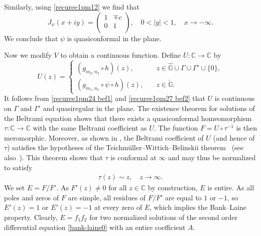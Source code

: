 \documentclass[12pt]{amsart}
\numberwithin{equation}{section}
\begin{document}
Similarly, using \eqref{recuree1pm12} we find that
\begin{equation*}%
J_{\psi}(x+iy)=\left(
                 \begin{array}{cc}
                 1 & \mp c \\
                 0 & 1 \\
                 \end{array}
               \right), \quad 0<|y|<1, \quad x\to-\infty.
\end{equation*}
We conclude that $\psi$ is quasiconformal in the plane.

Now we modify $V$ to obtain a continuous function. Define $U:\mathbb{C}\to \mathbb{C}$ by
\begin{equation}\label{recuree1pm32}
U(z)=\left\{
      \begin{array}{ll}
      (g_{m_2,n_2}\circ h)(z),            & \quad z\in \hat{\mathbb{G}}\cup\Gamma\cup\Gamma'\cup\{0\}, \\
      (g_{m_1,n_1}\circ \psi \circ h)(z), & \quad z\in \check{\mathbb{G}}.
      \end{array}
    \right.
\end{equation}
It follows from \eqref{recuree1pm24  bef1} and \eqref{recuree1pm27  bef2} that $U$ is continuous on $\Gamma$ and $\Gamma'$ and quasiregular in the plane. The existence theorem for solutions of the Beltrami equation \cite[{\S}~V.1]{lehtoVirtanen2008} shows that there exists a quasiconformal homeomorphism $\tau: \mathbb{C}\to \mathbb{C}$ with the same Beltrami coefficient as $U$. The function $F=U\circ\tau^{-1}$ is then meromorphic.
Moreover, as shown in \cite{Bergweilereremenko2017}, the Beltrami coefficient of $U$ (and hence of $\tau$) satisfies the hypotheses of the Teichm\"uller--Wittich--Belinskii theorem~\cite[\S~V.6]{lehtoVirtanen2008} (see also~\cite{Shishikura2018}). This theorem shows that $\tau$ is conformal at $\infty$ and may thus be normalized to satisfy
\begin{equation}\label{recuree1pm34}
\begin{split}
\tau(z)\sim z, \quad z\to\infty.
\end{split}
\end{equation}
We set $E=F/F'$. As $F'(z)\not=0$ for all $z\in \mathbb{C}$ by construction, $E$ is entire. As all poles and zeros of $F$ are simple, all residues of $F/F'$ are equal to $1$ or $-1$, so $E'(z)=1$ or $E'(z)=-1$ at every zero of $E$, which implies the Bank--Laine property. Clearly, $E=f_1f_2$ for two normalized solutions of the second order differential equation \eqref{bank-laine0} with an entire coefficient $A$.
\end{document}

